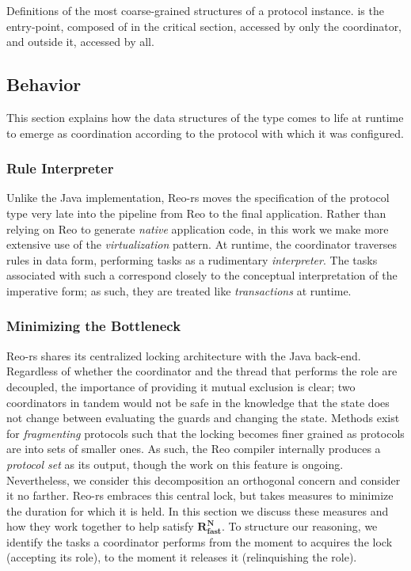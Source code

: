 \begin{listing}[ht]
	\centering
	\inputminted{rust}{proto.rs}
	\caption[Proto type with parts inside and outside the lock.]{Definitions of the most coarse-grained structures of a protocol instance.  is the entry-point, composed of  in the critical section, accessed by only the coordinator, and  outside it, accessed by all.}
	\label{listing:proto}
\end{listing}


\subsection{Behavior}
\label{sec:behavior_implementation}
This section explains how the data structures of the  type comes to life at runtime to emerge as coordination according to the protocol with which it was configured. 

\subsubsection{Rule Interpreter}
Unlike the Java implementation, Reo-rs moves the specification of the protocol type very late into the pipeline from Reo to the final application. Rather than relying on Reo to generate \textit{native} application code, in this work we make more extensive use of the \textit{virtualization} pattern. At runtime, the coordinator traverses rules in data form, performing tasks as a rudimentary \textit{interpreter}. The tasks associated with such a  correspond closely to the conceptual interpretation of the imperative form; as such, they are treated like \textit{transactions} at runtime. 


\subsubsection{Minimizing the Bottleneck}
Reo-rs shares its centralized locking architecture with the Java back-end. Regardless of whether the coordinator and the thread that performs the role are decoupled, the importance of providing it mutual exclusion is clear; two coordinators in tandem would not be safe in the knowledge that the state does not change between evaluating the guards and changing the state. Methods exist for \textit{fragmenting} protocols such that the locking becomes finer grained as protocols are into sets of smaller ones. As such, the Reo compiler internally produces a \textit{protocol set} as its output, though the work on this feature is ongoing. Nevertheless, we consider this decomposition an orthogonal concern and consider it no farther. Reo-rs embraces this central lock, but takes measures to minimize the duration for which it is held. In this section we discuss these measures and how they work together to help satisfy $\boldsymbol{R^N_{fast}}$. To structure our reasoning, we identify the tasks a coordinator performs from the moment to acquires the lock (accepting its role), to the moment it releases it (relinquishing the role). 

